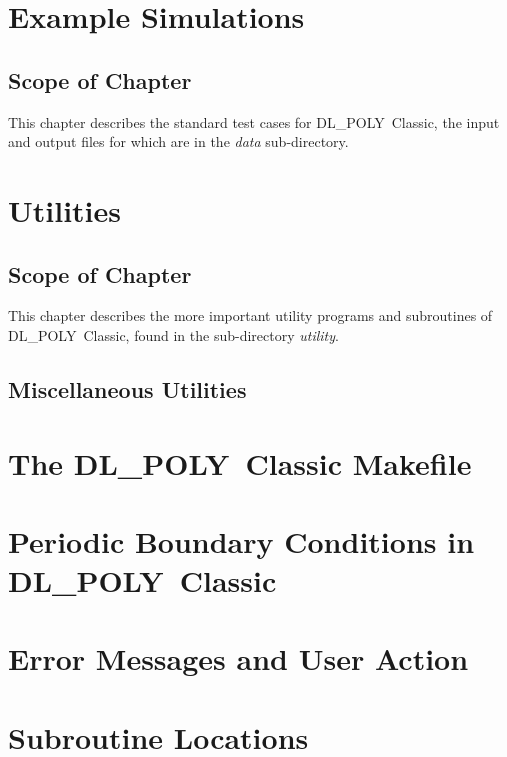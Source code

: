 \documentclass[11pt,a4paper,dvipdfmx]{report}
\newcommand{\D}{\mbox{DL\_POLY Classic}}
\begin{document}
\chapter{Example Simulations}
\label{data}
\setcounter{equation}{0}
\newpage
\section*{Scope of Chapter}
This chapter describes the standard test cases for \D{}, the input
and output files for which are in the {\em data} sub-directory.
\newpage


\chapter{Utilities}
\label{utility}
\setcounter{equation}{0}
\newpage
\section*{Scope of Chapter}
This chapter describes the more important utility programs and
subroutines of \D{}, found in the sub-directory {\em utility}. 

\section{Miscellaneous Utilities}


\clearpage
{}



\clearpage
\appendix
{}


\chapter{The \D{} Makefile}

\chapter{Periodic Boundary Conditions in \D{}}

\chapter{Error Messages and User Action}

\chapter{Subroutine Locations}


\clearpage
{}
\printindex
\end{document}
